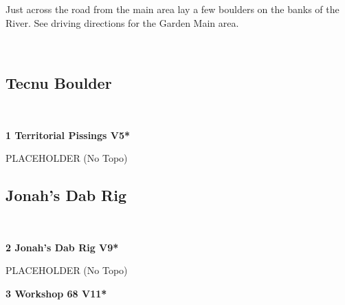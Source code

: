 \raggedcolumns
\begin{multicols}{2}
\begin{minipage}{\columnwidth}
Just across the road from the main area lay a few boulders on the banks of the River. See driving directions for the Garden Main area.
\end{minipage}

\newpage
	\begin{minipage}{\columnwidth}
	\
	\end{minipage}
	
			\begin{minipage}{\columnwidth}
			\subsection*{Tecnu Boulder}\label{bf:Tecnu Boulder}
			\
			
			\end{minipage}
			
					\begin{minipage}{\linewidth}	
					\label{rt:Territorial Pissings}
\colorbox{RoyalBlue!20}{
\parbox{0.95\textwidth}{
\textbf{
1 Territorial Pissings V5*  
}
}
}

					\begin{adjustwidth}{0.5cm}{}				
					PLACEHOLDER
						\newline (No Topo) 
					\end{adjustwidth}
					\end{minipage}
			\begin{minipage}{\columnwidth}
			\subsection*{Jonah's Dab Rig}\label{bf:Jonah's Dab Rig}
			\
			
			\end{minipage}
			
					\begin{minipage}{\linewidth}	
					\label{rt:Jonah's Dab Rig}
\colorbox{Goldenrod!50}{
\parbox{0.95\textwidth}{
\textbf{
2 Jonah's Dab Rig V9*  
}
}
}

					\begin{adjustwidth}{0.5cm}{}				
					PLACEHOLDER
						\newline (No Topo) 
					\end{adjustwidth}
					\end{minipage}
					\begin{minipage}{\linewidth}	
					\label{rt:Workshop 68}
\colorbox{red!20}{
\parbox{0.95\textwidth}{
\textbf{
3 Workshop 68 V11*  
}
}
}


\end{minipage}
\end{multicols}
